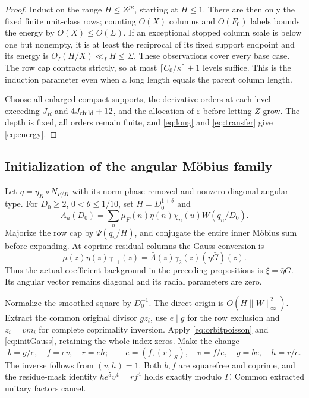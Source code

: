 \documentclass[11pt,a4paper]{article}
\numberwithin{equation}{section}
\theoremstyle{definition}
\theoremstyle{remark}
\newcommand{\eps}{\varepsilon}
\begin{document}
\begin{proof}
Induct on the range $H\le Z^{j\kappa}$, starting at $H\le1$. There are then only the fixed finite unit-class rows; counting $O(X)$ columns and $O(F_0)$ labels bounds the energy by $O(X)\le O(\Sigma)$. If an exceptional stopped column scale is below one but nonempty, it is at least the reciprocal of its fixed support endpoint and its energy is $O_I(H/X)\ll_I H\le\Sigma$. These observations cover every base case. The row cap contracts strictly, so at most $\lceil C_0/\kappa\rceil+1$ levels suffice. This is the induction parameter even when a long length equals the parent column length.

Choose all enlarged compact supports, the derivative orders at each level exceeding $J_R$ and $4J_{\rm child}+12$, and the allocation of $\eps$ before letting $Z$ grow. The depth is fixed, all orders remain finite, and \eqref{eq:long} and \eqref{eq:transfer} give \eqref{eq:energy}.
\end{proof}

\subsection{Initialization of the angular M\"obius family}\label{sec:initialization}
Let $\eta=\eta_K\circ N_{F/K}$ with its norm phase removed and nonzero diagonal angular type. For $D_0\ge2$, $0<\theta\le1/10$, set $H=D_0^{1+\theta}$ and
\[
 A_u(D_0)=\sum_n\mu_F(n)\eta(n)\chi_n(u)W(q_n/D_0).
\]
Majorize the row cap by $\Psi(q_u/H)$, and conjugate the entire inner M\"obius sum before expanding. At coprime residual columns the Gauss conversion is
\begin{equation}\label{eq:initGauss}
 \mu(z)\bar\eta(z)\gamma_{-1}(z)
  =\bar\Lambda(z)\gamma_2(z)(\bar\eta\bar G)(z).
\end{equation}
Thus the actual coefficient background in the preceding propositions is
$\xi=\bar\eta\bar G$. Its angular vector remains diagonal and its radial parameters are zero.

Normalize the smoothed square by $D_0^{-1}$. The direct origin is $O(H\|W\|_\infty^2)$. Extract the common original divisor $gz_i$, use $e\mid g$ for the row exclusion and $z_i=vm_i$ for complete coprimality inversion. Apply \eqref{eq:orbitpoisson} and \eqref{eq:initGauss}, retaining the whole-index zeros. Make the change
\begin{equation}\label{eq:initmap}
 b=g/e,\quad f=ev,\quad r=eh;\qquad
 e=(f,(r)_S),\quad v=f/e,\quad g=be,\quad h=r/e .
\end{equation}
The inverse follows from $(v,h)=1$. Both $b,f$ are squarefree and coprime, and the residue-mask identity $he^5v^4=rf^4$ holds exactly modulo $\Gamma$. Common extracted unitary factors cancel.
\end{document}
